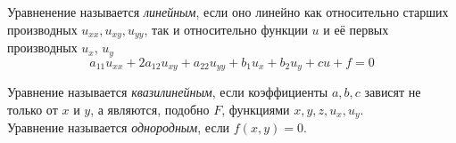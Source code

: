 Уравненение называется \textit{линейным}, если оно линейно как относительно старших производных $u_{xx}, u_{xy}, u_{yy}$, так и относительно функции $u$ и её первых производных $u_x$, $u_y$
\[
	a_{11} u_{xx} + 2 a_{12} u_{xy} + a_{22} u_{yy} + b_1 u_x + b_2 u_y + c u + f = 0
\]

Уравнение называется \textit{квазилинейным}, если коэффициенты $a, b, c$ зависят не только от $x$ и $y$, а являются, подобно $F$, функциями $x, y, z, u_x, u_y$.\\




Уравнение называется \textit{однородным}, если $f(x, y) = 0$.\\